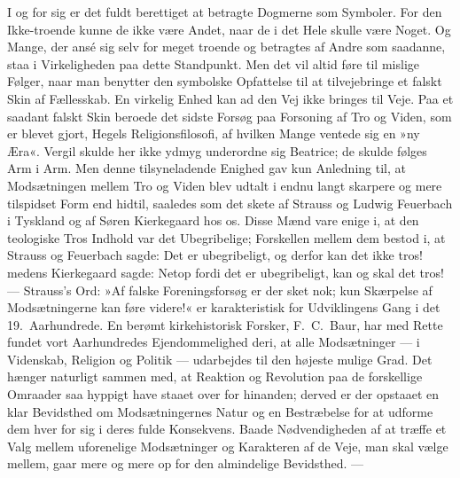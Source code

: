 \documentclass[12pt,a4paper]{article}
\begin{document}
I og for sig er det fuldt berettiget at betragte Dogmerne som Symboler. For den
Ikke-troende kunne de ikke være Andet, naar de i det Hele skulle være Noget. Og Mange,
der ansé sig selv for meget troende og betragtes af Andre som saadanne, staa i
Virkeligheden paa dette Standpunkt. Men det vil altid føre til mislige Følger, naar man
benytter den symbolske Opfattelse til at tilvejebringe et falskt Skin af Fællesskab. En
virkelig Enhed kan ad den Vej ikke bringes til Veje. Paa et saadant falskt Skin beroede
det sidste Forsøg paa Forsoning af Tro og Viden, som er blevet gjort, Hegels
Religionsfilosofi, af hvilken Mange ventede sig en »ny Æra«. Vergil skulde her ikke ydmyg
underordne sig Beatrice; de skulde følges Arm i Arm. Men denne tilsyneladende Enighed gav
kun Anledning til, at Modsætningen mellem Tro og Viden blev udtalt i endnu langt skarpere
og mere tilspidset Form end hidtil, saaledes som det skete af Strauss og Ludwig Feuerbach i
Tyskland og af Søren Kierkegaard hos os. Disse Mænd vare enige i, at den teologiske Tros
Indhold var det Ubegribelige; Forskellen mellem dem bestod i, at Strauss og Feuerbach sagde:
Det er ubegribeligt, og derfor kan det ikke tros! medens Kierkegaard sagde: Netop fordi det
er ubegribeligt, kan og skal det tros! --- Strauss's Ord: »Af falske Foreningsforsøg er der
sket nok; kun Skærpelse af Modsætningerne kan føre videre!« er karakteristisk for
Udviklingens Gang i det 19.\ Aarhundrede. En berømt kirkehistorisk Forsker, F.\ C.\ Baur,
har med Rette fundet vort Aarhundredes Ejendommelighed deri, at alle Modsætninger --- i
Videnskab, Religion og Politik --- udarbejdes til den højeste mulige Grad. Det hænger
naturligt sammen med, at Reaktion og Revolution paa de forskellige Omraader saa hyppigt
have staaet over for hinanden; derved er der opstaaet en klar Bevidsthed om Modsætningernes
Natur og en Bestræbelse for at udforme dem hver for sig i deres fulde Konsekvens. Baade
Nødvendigheden af at træffe et Valg mellem uforenelige Modsætninger og Karakteren af de
Veje, man skal vælge mellem, gaar mere og mere op for den almindelige Bevidsthed. ---
\end{document}

